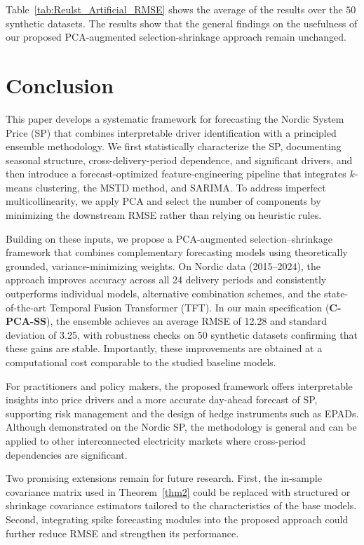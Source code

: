 \documentclass{article}
\begin{document}
Table~\ref{tab:Reulst_Artificial_RMSE} shows the average of the results over the $50$ synthetic datasets. The results show that the general findings on the usefulness of our proposed PCA-augmented selection-shrinkage approach remain unchanged. 


\section{Conclusion} \label{sec:conc}
This paper develops a systematic framework for forecasting the Nordic System Price (SP) that combines interpretable driver identification with a principled ensemble methodology. We first statistically characterize the SP, documenting seasonal structure, cross-delivery-period dependence, and significant drivers, and then introduce a forecast-optimized feature-engineering pipeline that integrates $k$-means clustering, the MSTD method, and SARIMA. To address imperfect multicollinearity, we apply PCA and select the number of components by minimizing the downstream RMSE rather than relying on heuristic rules. 

Building on these inputs, we propose a PCA-augmented selection–shrinkage framework that combines complementary forecasting models using theoretically grounded, variance-minimizing weights. On Nordic data (2015–2024), the approach improves accuracy across all 24 delivery periods and consistently outperforms individual models, alternative combination schemes, and the state-of-the-art Temporal Fusion Transformer (TFT). In our main specification (\textbf{C-PCA-SS}), the ensemble achieves an average RMSE of 12.28 and standard deviation of 3.25, with robustness checks on 50 synthetic datasets confirming that these gains are stable. Importantly, these improvements are obtained at a computational cost comparable to the studied baseline models. 

For practitioners and policy makers, the proposed framework offers interpretable insights into price drivers and a more accurate day-ahead forecast of SP, supporting risk management and the design of hedge instruments such as EPADs. Although demonstrated on the Nordic SP, the methodology is general and can be applied to other interconnected electricity markets where cross-period dependencies are significant.

Two promising extensions remain for future research. First, the in-sample covariance matrix used in Theorem~\ref{thm2} could be replaced with structured or shrinkage covariance estimators tailored to the characteristics of the base models. 
Second, integrating spike forecasting modules into the proposed approach could further reduce RMSE and strengthen its performance.
\end{document}

